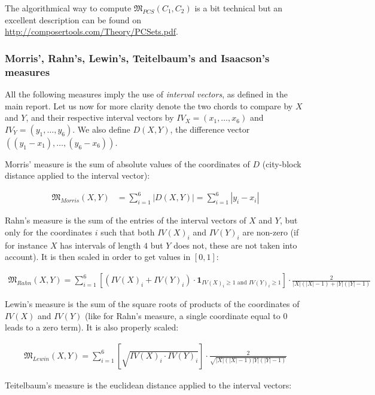 \documentclass[a4paper,10pt]{article}
\begin{document}
The algorithmical way to compute $\mathfrak{M}_{PCS}(C_1,C_2)$ is a bit technical but an excellent description can be found on \href{http://composertools.com/Theory/PCSets.pdf}{http://composertools.com/Theory/PCSets.pdf}.


\subsubsection*{Morris', Rahn's, Lewin's, Teitelbaum's and Isaacson's measures}

All the following measures imply the use of \emph{interval vectors}, as defined in the main report. Let us now for more clarity denote the two chords to compare by $X$ and $Y$, and their respective interval vectors by $IV_X=(x_1,\dots,x_6)$ and $IV_Y=(y_1,\dots,y_6)$. We also define $D(X,Y)$, the difference vector $((y_1-x_1),\dots,(y_6-x_6))$.

Morris' measure is the sum of absolute values of the coordinates of $D$ (city-block distance applied to the interval vector):

\begin{align*}
\mathfrak{M}_{Morris}(X,Y)& = \sum_{i=1}^6 \left|D(X,Y)\right| = \sum_{i=1}^6 \left|y_i-x_i\right|
\end{align*}

Rahn's measure is the sum of the entries of the interval vectors of $X$ and $Y$, but only for the coordinates $i$ such that both $IV(X)_i$ and $IV(Y)_i$ are non-zero (if for instance $X$ has intervals of length $4$ but $Y$ does not, these are not taken into account). It is then scaled in order to get values in $[0,1]$:


\begin{align*}
\mathfrak{M}_{Rahn}(X,Y) = \sum_{i=1}^6 \left[\left(IV(X)_i+IV(Y)_i\right)\cdot\textbf{1}_{IV(X)_i\geq1\text{ and }IV(Y)_i\geq1}\right] \cdot \frac{2}{|X|(|X|-1)+|Y|(|Y|-1)}
\end{align*}

Lewin's measure is the sum of the square roots of products of the coordinates of $IV(X)$ and $IV(Y)$ (like for Rahn's measure, a single coordinate equal to $0$ leads to a zero term). It is also properly scaled:

\begin{align*}
\mathfrak{M}_{Lewin}(X,Y) = \sum_{i=1}^6 \left[\sqrt{IV(X)_i\cdot IV(Y)_i}\right] \cdot \frac{2}{\sqrt{|X|(|X|-1)|Y|(|Y|-1)}}
\end{align*}

Teitelbaum's measure is the euclidean distance applied to the interval vectors:
\end{document}
